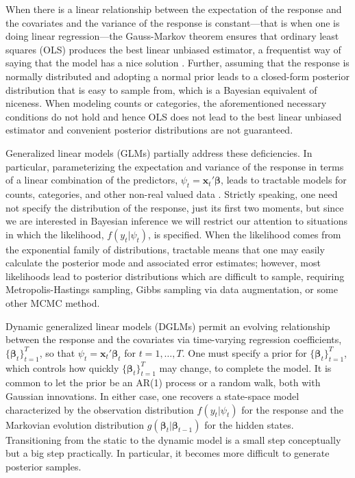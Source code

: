 \documentclass[12pt]{article}
\newcommand{\bbeta}{\boldsymbol{\beta}}
\newcommand{\vx}{\boldsymbol{x}}
\begin{document}
When there is a linear relationship between the expectation of the response and
the covariates and the variance of the response is constant---that is when one
is doing linear regression---the Gauss-Markov theorem ensures that ordinary
least squares (OLS) produces the best linear unbiased estimator, a frequentist
way of saying that the model has a nice solution \citep{christensen-book-2001}.
Further, assuming that the response is normally distributed and adopting a
normal prior leads to a closed-form posterior distribution that is easy to
sample from, which is a Bayesian equivalent of niceness.  When modeling counts
or categories, the aforementioned necessary conditions do not hold and hence OLS
does not lead to the best linear unbiased estimator and convenient posterior
distributions are not guaranteed.

Generalized linear models (GLMs) partially address these deficiencies.  In
particular, parameterizing the expectation and variance of the response in terms
of a linear combination of the predictors, $\psi_t = \vx_t' \bbeta$, leads to
tractable models for counts, categories, and other non-real valued data
\citep{mccullagh-nelder-1989, wedderburn-1974}.  Strictly speaking, one need not
specify the distribution of the response, just its first two moments, but since
we are interested in Bayesian inference we will restrict our attention to
situations in which the likelihood, $f(y_t | \psi_t)$, is specified.
When the likelihood comes from the exponential family of
distributions, tractable means that one may easily calculate the posterior mode
and associated error estimates; however, most likelihoods lead to posterior
distributions which are difficult to sample, requiring Metropolis-Hastings
sampling, Gibbs sampling via data augmentation, or some other MCMC method.

Dynamic generalized linear models (DGLMs) permit an evolving relationship
between the response and the covariates via time-varying regression
coefficients, $\{\bbeta_t\}_{t=1}^T$, so that $\psi_t = \vx_t' \bbeta_t$ for
$t=1, \ldots, T$.  One must specify a prior for $\{\bbeta_t\}_{t=1}^T$, which
controls how quickly $\{\bbeta_t\}_{t=1}^T$ may change, to complete the model.
It is common to let the prior be an AR(1) process or a random walk, both with
Gaussian innovations.  In either case, one recovers a state-space model
characterized by the observation distribution $f(y_t | \psi_t)$ for the response
and the Markovian evolution distribution $g(\bbeta_t | \bbeta_{t-1})$ for the
hidden states.  Transitioning from the static to the dynamic model is a small
step conceptually but a big step practically.  In particular, it becomes more
difficult to generate posterior samples.
\end{document}

